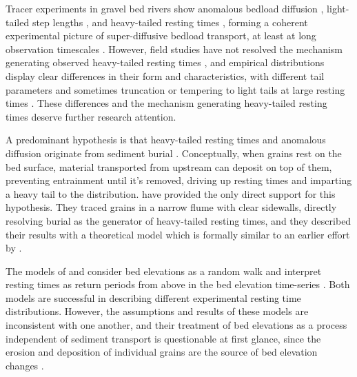 \documentclass[draft]{agujournal2018}
\begin{document}
Tracer experiments in gravel bed rivers show anomalous bedload diffusion \citep{Phillips2013, Bradley2017}, light-tailed step lengths \citep{Bradley2012, Hassan2013}, and heavy-tailed resting times \citep{Voepel2013, Olinde2015, Pretzlav2016, Bradley2017}, forming a coherent experimental picture of super-diffusive bedload transport, at least at long observation timescales \citep[e.g.][]{Nikora2002, Martin2012}.
However, field studies have not resolved the mechanism generating observed heavy-tailed resting times \citep[e.g.][]{Bradley2017}, and empirical distributions display clear differences in their form and characteristics, with different tail parameters \citep[e.g.][]{Olinde2015} and sometimes truncation \citep[e.g.][]{Bradley2017} or tempering to light tails at large resting times \citep[e.g.][]{Voepel2013}.
These differences and the mechanism generating heavy-tailed resting times deserve further research attention.

A predominant hypothesis is that heavy-tailed resting times and anomalous diffusion originate from sediment burial \citep{Voepel2013,Martin2014,Wu2019}.
Conceptually, when grains rest on the bed surface, material transported from upstream can deposit on top of them, preventing entrainment until it's removed, driving up resting times and imparting a heavy tail to the distribution.
\citet{Martin2014} have provided the only direct support for this hypothesis.
They traced grains in a narrow flume with clear sidewalls, directly resolving burial as the generator of heavy-tailed resting times, and they described their results with a theoretical model which is formally similar to an earlier effort by \citet{Voepel2013}.

The models of \citet{Voepel2013} and \citet{Martin2014} consider bed elevations as a random walk and interpret resting times as return periods from above in the bed elevation time-series \citep[e.g.][]{Redner2007}.
Both models are successful in describing different experimental resting time distributions.
However, the assumptions and results of these models are inconsistent with one another, and their treatment of bed elevations as a process independent of sediment transport is questionable at first glance, since the erosion and deposition of individual grains are the source of bed elevation changes \citep[e.g.][]{Wong2007}.
\end{document}
